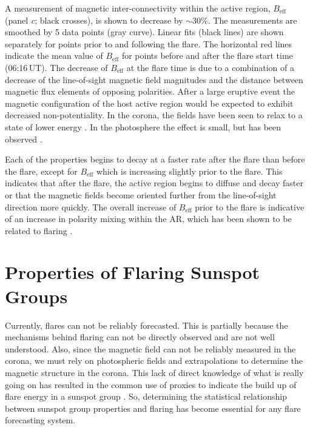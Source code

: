 {A measurement of magnetic inter-connectivity within the active region, $B_{\mathrm{eff}}$ (panel \emph{c}; black crosses), is shown to decrease by $\sim$30\%. The measurements are smoothed by 5 data points (gray curve). Linear fits (black lines) are shown separately for points prior to and following the flare. The horizontal red lines indicate the mean value of  $B_{\mathrm{eff}}$ for points before and after the flare start time (06:16\,UT). The decrease of $B_{\mathrm{eff}}$ at the flare time is due to a combination of a decrease of the line-of-sight magnetic field magnitudes and the distance between magnetic flux elements of opposing polarities. After a large eruptive event the magnetic configuration of the host active region would be expected to exhibit decreased non-potentiality. In the corona, the fields have been seen to relax to a state of lower energy  \citep{Conlon:2010b}. In the photosphere the effect is small, but has been observed \citep{Sudol:2005,Murray:2012}. %

Each of the properties begins to decay at a faster rate after the flare than before the flare, except for $B_{\mathrm{eff}}$ which is increasing slightly prior to the flare. This indicates that after the flare, the active region begins to diffuse and decay faster or that the magnetic fields become oriented further from the line-of-sight direction more quickly. The overall increase of $B_{\mathrm{eff}}$ prior to the flare is indicative of an increase in polarity mixing within the \gls{AR}, which has been shown to be related to flaring \citep{Georgoulis:2007}. 

\section{Properties of Flaring Sunspot Groups}\label{sect:statflr}

Currently, flares can not be reliably forecasted. This is partially because the mechanisms behind flaring can not be directly observed and are not well understood. Also, since the magnetic field can not be reliably measured in the corona, we must rely on photospheric fields and extrapolations to determine the magnetic structure in the corona. This lack of direct knowledge of what is really going on has resulted in the common use of proxies to indicate the build up of flare energy in a sunspot group \citep{Schrijver:2007,Falconer:2008}. So, determining the statistical relationship between sunspot group properties and flaring has become essential for any flare forecasting system. 

}
